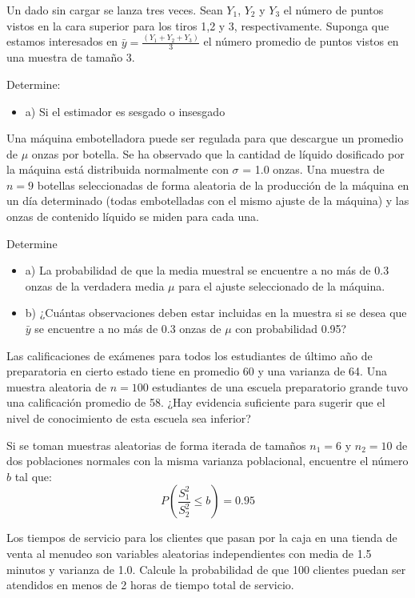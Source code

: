 \documentclass{../oxmathproblems}
\begin{document}
\begin{questions}
\miquestion Un dado sin cargar se lanza tres veces. Sean $Y_1$, $Y_2$ y $Y_3$ el número de puntos vistos en la cara superior para los tiros 1,2 y 3, respectivamente. Suponga que estamos interesados en 
$ \bar{y}= \frac{(Y_1 + Y_2 + Y_3)}{3} $ 
el número promedio de puntos vistos en una muestra de tamaño 3. 

Determine: 
\begin{itemize}
\item a) Si el estimador es sesgado o insesgado
\end{itemize}

\miquestion Una máquina embotelladora puede ser regulada para que descargue un promedio de $\mu$ onzas por botella. Se ha observado que la cantidad de líquido dosificado por la máquina está distribuida normalmente con $\sigma$ = 1.0 onzas. Una muestra de $n = 9$ botellas seleccionadas de forma aleatoria de la producción de la máquina en un día determinado (todas embotelladas con el mismo ajuste de la máquina) y las onzas de contenido líquido se miden para cada una.

Determine 
\begin{itemize}
\item a) La probabilidad de que la media muestral se encuentre a no más de 0.3 onzas de la verdadera media $\mu$ para el ajuste seleccionado de la máquina. 
\item b) ¿Cuántas observaciones deben estar incluidas en la muestra si se desea que $\bar{y}$ se encuentre a no más de 0.3 onzas de $\mu$ con probabilidad 0.95?
\end{itemize}

\miquestion Las calificaciones de exámenes para todos los estudiantes de último año de preparatoria en cierto estado tiene en promedio 60 y una varianza de 64. Una muestra aleatoria de $n = 100$ estudiantes de una escuela preparatorio grande tuvo una calificación promedio de 58. ¿Hay evidencia suficiente para sugerir que el nivel de conocimiento de esta escuela sea inferior?


\miquestion Si se toman muestras aleatorias de forma iterada de tamaños $n_1 = 6$ y $n_2 =10$ de dos poblaciones normales con la misma varianza poblacional, encuentre el número $b$ tal que: 
$$ P(\frac{S_1^2}{S_2^2} \leq b) = 0.95 $$ 

\miquestion Los tiempos de servicio para los clientes que pasan por la caja en una tienda de venta al menudeo son variables aleatorias independientes con media de 1.5 minutos y varianza de 1.0. 
Calcule la  probabilidad de que 100 clientes puedan ser atendidos en menos de 2 horas de tiempo total de servicio. 


\end{questions}
\end{document}

